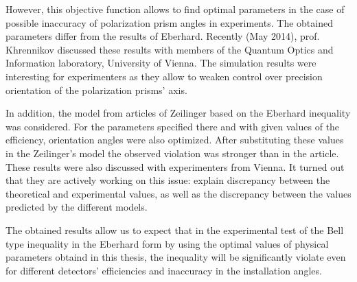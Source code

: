 \documentclass[%
master,         %
subf,           %
href,           %
colorlinks=true %
]{disser}
\numberwithin{equation}{section}
\numberwithin{figure}{section}
\begin{document}
However, this objective function allows to find optimal parameters in the case of possible inaccuracy of polarization prism angles in experiments. 
The obtained parameters differ from the results of Eberhard. Recently (May 2014), prof. Khrennikov discussed these results with members of the Quantum Optics and Information laboratory, University of Vienna. The simulation results were interesting for experimenters as they allow to weaken control over precision orientation of the polarization prisms' axis.

In addition, the model from articles of Zeilinger \cite{Zeilinger, Zeilinger1} based on the Eberhard inequality was considered. For the parameters specified there and with given values of the efficiency, orientation angles were also optimized. After substituting these values in the Zeilinger's model the observed violation was stronger than in the article. These results were also discussed with experimenters from Vienna. It turned out that they are actively working on this issue: explain discrepancy between the theoretical and experimental values, as well as the discrepancy between the values predicted by the different models. 

The obtained results allow us to expect that in the experimental test of the Bell type inequality in the Eberhard form by using the optimal values of physical parameters obtaind in this thesis, the inequality will be significantly violate even for different detectors' efficiencies and inaccuracy in the installation angles.



\end{document}
